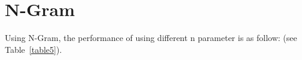 \documentclass[11pt]{article}
\begin{document}












\section{N-Gram}

Using N-Gram, the performance of using different n parameter is as follow: (see Table~\ref{table5}).
\end{document}
